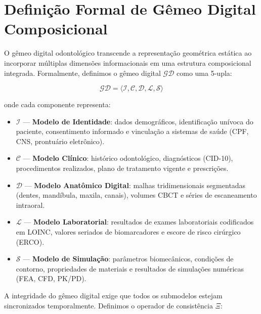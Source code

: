 
\section{Definição Formal de Gêmeo Digital Composicional}
\label{sec:definicao-gd}

O gêmeo digital odontológico transcende a representação geométrica estática ao incorporar múltiplas dimensões informacionais em uma estrutura composicional integrada. Formalmente, definimos o gêmeo digital $\mathcal{GD}$ como uma 5-upla:

\begin{equation}
\label{eq:gd-formal}
\mathcal{GD} = \langle \mathcal{I}, \mathcal{C}, \mathcal{D}, \mathcal{L}, \mathcal{S} \rangle
\end{equation}

onde cada componente representa:
\begin{itemize}
  \item $\mathcal{I}$ — \textbf{Modelo de Identidade}: dados demográficos, identificação unívoca do paciente, consentimento informado e vinculação a sistemas de saúde (CPF, CNS, prontuário eletrônico).
  \item $\mathcal{C}$ — \textbf{Modelo Clínico}: histórico odontológico, diagnósticos (CID-10), procedimentos realizados, plano de tratamento vigente e prescrições.
  \item $\mathcal{D}$ — \textbf{Modelo Anatômico Digital}: malhas tridimensionais segmentadas (dentes, mandíbula, maxila, canais), volumes CBCT e séries de escaneamento intraoral.
  \item $\mathcal{L}$ — \textbf{Modelo Laboratorial}: resultados de exames laboratoriais codificados em LOINC, valores seriados de biomarcadores e escore de risco cirúrgico (ERCO).
  \item $\mathcal{S}$ — \textbf{Modelo de Simulação}: parâmetros biomecânicos, condições de contorno, propriedades de materiais e resultados de simulações numéricas (FEA, CFD, PK/PD).
\end{itemize}

A integridade do gêmeo digital exige que todos os submodelos estejam sincronizados temporalmente. Definimos o operador de consistência $\Xi$:

